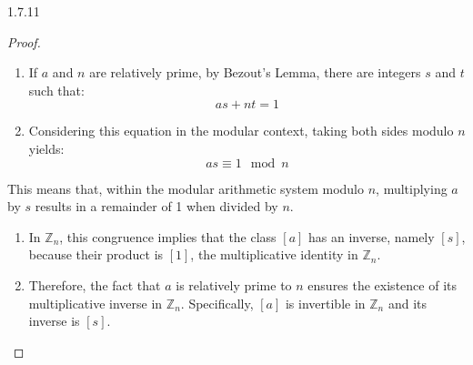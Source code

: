 \documentclass[12pt]{amsart}
\theoremstyle{definition}
\numberwithin{equation}{section}
\theoremstyle{plain}
\newcommand{\Z}{\mathbb{Z}}
\begin{document}
\begin{exercise}{1.7.11}
    \begin{proof} $ $\newline

    \begin{enumerate}
        \item If \( a \) and \( n \) are relatively prime, by Bezout's Lemma, there are integers \( s \) and \( t \) such that: \[ as + nt = 1 \]
        \item Considering this equation in the modular context, taking both sides modulo \( n \) yields: \[ as \equiv 1 \mod n \]
    \end{enumerate}
    
    This means that, within the modular arithmetic system modulo \( n \), multiplying \( a \) by \( s \) results in a remainder of 1 when divided by \( n \).
    \begin{enumerate}
        \item In \( \Z_n \), this congruence implies that the class \( [a] \) has an inverse, namely \( [s] \), because their product is \( [1] \), the multiplicative identity in \( \Z_n \).
        \item Therefore, the fact that \( a \) is relatively prime to \( n \) ensures the existence of its multiplicative inverse in \( \Z_n \). Specifically, \( [a] \) is invertible in \( \Z_n \) and its inverse is \( [s] \).
    \end{enumerate}
    \end{proof}
\end{exercise}
\end{document}
